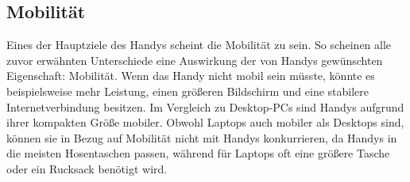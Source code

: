\subsection{Mobilität}
Eines der Hauptziele des Handys scheint die Mobilität zu sein. %
	So scheinen alle zuvor erwähnten Unterschiede eine Auswirkung der von Handys gewünschten Eigenschaft: Mobilität. %
		Wenn das Handy nicht mobil sein müsste, könnte es beispielsweise mehr Leistung, einen größeren Bildschirm und eine stabilere Internetverbindung besitzen.\newline%
Im Vergleich zu Desktop-PCs sind Handys aufgrund ihrer kompakten Größe mobiler. Obwohl Laptops auch mobiler als Desktops sind, können sie in Bezug auf Mobilität nicht mit Handys konkurrieren, da Handys in die meisten Hosentaschen passen, während für Laptops oft eine größere Tasche oder ein Rucksack benötigt wird.%
%
%
%
%
%	
%
%
